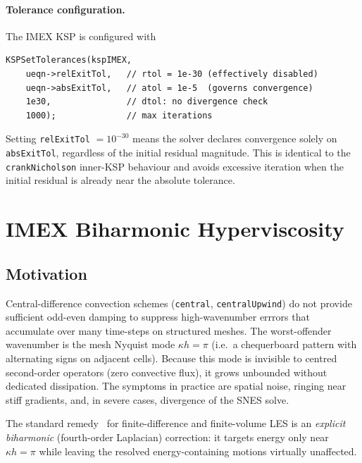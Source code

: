 \documentclass[12pt,a4paper]{article}
\begin{document}
	\paragraph{Tolerance configuration.}
	The IMEX KSP is configured with
	\begin{lstlisting}
KSPSetTolerances(kspIMEX,
    ueqn->relExitTol,   // rtol = 1e-30 (effectively disabled)
    ueqn->absExitTol,   // atol = 1e-5  (governs convergence)
    1e30,               // dtol: no divergence check
    1000);              // max iterations
	\end{lstlisting}
	Setting \texttt{relExitTol} $= 10^{-30}$ means the solver declares
	convergence solely on \texttt{absExitTol}, regardless of the initial
	residual magnitude.
	This is identical to the \texttt{crankNicholson} inner-KSP behaviour and
	avoids excessive iteration when the initial residual is already near the
	absolute tolerance.

	\section{IMEX Biharmonic Hyperviscosity}
	\label{sec:hypervisc}

	\subsection{Motivation}

	Central-difference convection schemes (\texttt{central}, \texttt{centralUpwind})
	do not provide sufficient odd-even damping to suppress high-wavenumber
	errrors that accumulate over many time-steps on structured meshes.
	The worst-offender wavenumber is the mesh Nyquist mode
	$\kappa h = \pi$ (i.e.\ a chequerboard pattern with alternating
	signs on adjacent cells). Because this mode is invisible to
	centred second-order operators (zero convective flux), it grows
	unbounded without dedicated dissipation. The symptoms in practice
	are spatial noise, ringing near stiff gradients, and, in
	severe cases, divergence of the SNES solve.

	The standard remedy~\cite{Lele1992,Ghosal1996} for finite-difference
	and finite-volume LES is an \emph{explicit biharmonic}
	(fourth-order Laplacian) correction: it targets energy only near
	$\kappa h = \pi$ while leaving the resolved energy-containing
	motions virtually unaffected.
\end{document}
